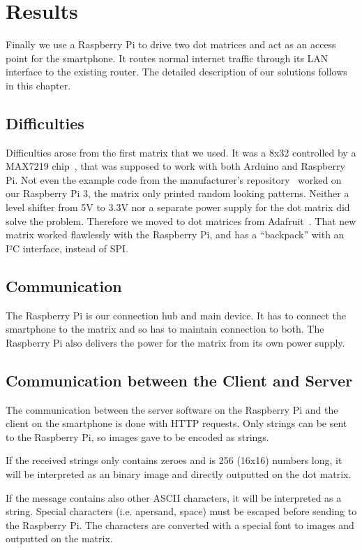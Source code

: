 \documentclass[conference]{IEEEtran}
\begin{document}
\section{Results}
Finally we use a Raspberry Pi to drive two dot matrices and act as an access point for the smartphone. It routes normal internet traffic through its LAN interface to the existing router. The detailed description of our solutions follows in this chapter.

\subsection{Difficulties}
Difficulties arose from the first matrix that we used. It was a 8x32 controlled by a MAX7219 chip~\cite{azdelivery464}, that was supposed to work with both Arduino and Raspberry Pi. Not even the example code from the manufacturer's repository~\cite{azdelivery464} worked on our Raspberry Pi 3, the matrix only printed random looking patterns. Neither a level shifter from 5V to 3.3V nor a separate power supply for the dot matrix did solve the problem. Therefore we moved to dot matrices from Adafruit~\cite{adafruit88}. That new matrix worked flawlessly with the Raspberry Pi, and has a ``backpack'' with an I²C interface, instead of SPI.

\subsection{Communication}
The Raspberry Pi is our connection hub and main device. It has to connect the smartphone to the matrix and so has to maintain connection to both. The Raspberry Pi also delivers the power for the matrix from its own power supply.

\subsection{Communication between the Client and Server}
The communication between the server software on the Raspberry Pi and the client on the smartphone is done with HTTP requests. Only strings can be sent to the Raspberry Pi, so images gave to be encoded as strings.

If the received strings only contains zeroes and is 256 (16x16) numbers long, it will be interpreted as an binary image and directly outputted on the dot matrix.

If the message contains also other ASCII characters, it will be interpreted as a string. Special characters (i.e. apersand, space) must be escaped before sending to the Raspberry Pi. The characters are converted with a special font to images and outputted on the matrix.
\end{document}
